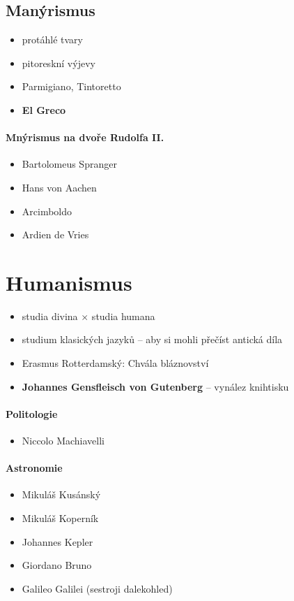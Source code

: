\subsection{Manýrismus}
\begin{itemize}
\item protáhlé tvary
\item pitoreskní výjevy
\item Parmigiano, Tintoretto
\item \textbf{El Greco}
\end{itemize}

\paragraph{Mnýrismus na dvoře Rudolfa II.}
\begin{itemize}
\item Bartolomeus Spranger
\item Hans von Aachen
\item Arcimboldo
\item Ardien de Vries
\end{itemize}

\section{Humanismus}
\begin{itemize}
\item studia divina $\times$ studia humana
\item studium klasických jazyků -- aby si mohli přečíst antická díla
\item Erasmus Rotterdamský: Chvála bláznovství
\item \textbf{Johannes Gensfleisch von Gutenberg} -- vynález knihtisku
\end{itemize}

\paragraph{Politologie}
\begin{itemize}
\item Niccolo Machiavelli
\end{itemize}

\paragraph{Astronomie}
\begin{itemize}
\item Mikuláš Kusánský
\item Mikuláš Koperník
\item Johannes Kepler
\item Giordano Bruno
\item Galileo Galilei (sestroji dalekohled)
\end{itemize}

